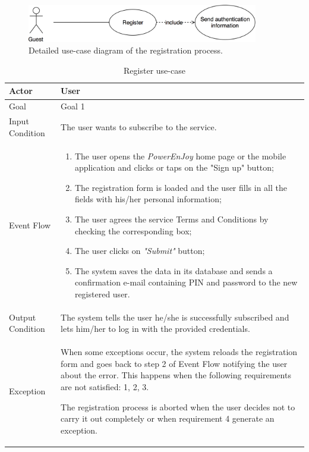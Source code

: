 \begin{figure}[H]
\begin{center}
		\includegraphics[width=0.9\textwidth]{./specific_requirements/features/diagrams/registration_proc_uc.png}
		\caption{Detailed use-case diagram of the registration process.}
		\label{register_det_uc}
\end{center}
\end{figure}

\begin{table}[H]
\begin{center}
\begin{tabular}{p{} | p{}}
\hline
Actor & User\\
\hline
Goal & Goal 1\\
\hline
Input Condition & The user wants to subscribe to the service.\\
\hline
Event Flow & 
\begin{enumerate}
\item The user opens the \emph{PowerEnJoy} home page or the mobile application and clicks or taps on the "Sign up" button;
\item The registration form is loaded and the user fills in all the fields with his/her personal information;
\item The user agrees the service Terms and Conditions by checking the corresponding box;
\item The user clicks on \emph{"Submit"} button;
\item The system saves the data in its database and sends a confirmation e-mail containing PIN and password to the new registered user.
\end{enumerate} \\
\hline
Output Condition & The system tells the user he/she is successfully subscribed and lets him/her to log in with the provided credentials.\\
\hline
Exception & When some exceptions occur, the system reloads the registration form and goes back to step 2 of Event Flow notifying the user about the error. This happens when the following requirements are not satisfied: 1, 2, 3.

The registration process is aborted when the user decides not to carry it out completely or when requirement 4 generate an exception.\\
\hline
\end{tabular}
\end{center}
\caption{Register use-case}
\label{register_uc}
\end{table}

